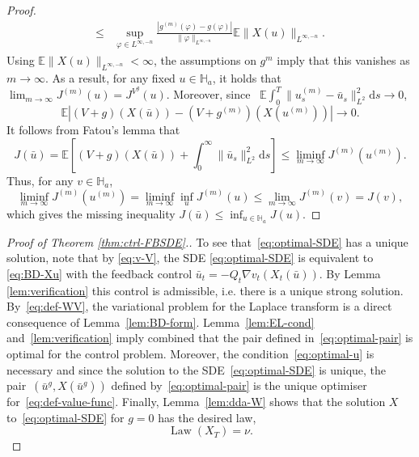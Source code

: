 \documentclass[11pt, a4paper]{scrartcl}
\numberwithin{equation}{section}
\theoremstyle{plain}
\theoremstyle{remark}
\newcommand{\mathd}{\mathrm{d}}
\newcommand{\tmop}[1]{\ensuremath{\operatorname{#1}}}
\begin{document}
\begin{proof}
\begin{equation*}
\begin{aligned}
    \leqslant&
    \sup_{\varphi \in L^{\infty, - n}} \frac{| g^{(m)}(\varphi) - g(\varphi) |}{\|\varphi\|_{L^{\infty,-n}}} \mathbb{E} \|X(u)\|_{L^{\infty,-n}}.
    \end{aligned}
  \end{equation*}
  Using $\mathbb{E} \|X(u)\|_{L^{\infty,-n}}<\infty$, the assumptions on $g^{m}$ imply that this vanishes as $m\to\infty$. As a result, for any fixed $u \in \mathbb{H}_a$, it holds that $\lim_{m \rightarrow \infty}
  J^{(m)} (u) = J^{V^g} (u) $. Moreover, since \ $\mathbb{E} {\int_0^T}  \|
  u_s^{(m)} - \bar{u}_s \|_{L^2}^2 \mathd s \rightarrow 0$, 
  \[ \mathbb{E} | (V + g) (X (\bar{u})) - (V + g^{(m)}) (X (u^{(m)})) |
     \rightarrow 0. \]
  It follows from Fatou's lemma that
  \[ J (\bar{u}) =\mathbb{E} \left[ (V + g) (X (\bar{u})) + \int_0^{\infty}
     \| \bar{u}_s \|_{L^2}^2 \mathd s \right] \leqslant \liminf_{m \rightarrow
     \infty} J^{(m)} (u^{(m)}) . \]
  Thus, for any $v \in \mathbb{H}_a$,
  \[ \liminf_{m \rightarrow \infty} J^{(m)} (u^{(m)}) = \liminf_{m \rightarrow
     \infty} \inf_u J^{(m)} (u) \leqslant \lim_{m \rightarrow \infty} J^{(m)}
     (v) = J (v), \]
  which gives the missing inequality $J (\bar{u}) \leqslant \inf_{u \in
  \mathbb{H}_a} J (u)$.
\end{proof}

\begin{proof}[Proof of Theorem \ref{thm:ctrl-FBSDE}.]
  To see that~\eqref{eq:optimal-SDE} has a unique solution, note that by
  \eqref{eq:v-V}, the SDE \eqref{eq:optimal-SDE} is equivalent to
  \eqref{eq:BD-Xu} with the feedback control $\bar{u}_t = - Q_t \nabla v_t
  (X_t (\bar{u}))$. By Lemma \ref{lem:verification} this control is
  admissible, i.e. there is a unique strong solution. By~\eqref{eq:def-WV},
  the variational problem for the Laplace transform is a direct consequence of
  Lemma~\ref{lem:BD-form}. Lemma~\ref{lem:EL-cond} and~\ref{lem:verification}
  imply combined that the pair defined in~\eqref{eq:optimal-pair} is optimal
  for the control problem. Moreover, the condition~\eqref{eq:optimal-u} is
  necessary and since the solution to the SDE~\eqref{eq:optimal-SDE} is
  unique, the pair~$(\bar{u}^g, X (\bar{u}^g))$ defined
  by~\eqref{eq:optimal-pair} is the unique optimiser
  for~\eqref{eq:def-value-func}. Finally, Lemma~\ref{lem:dda-W} shows that the solution $X$ to~\eqref{eq:optimal-SDE}
  for $g = 0$ has the desired law,
  \[ \tmop{Law} (X_T) = \nu . \]
\end{proof}
\end{document}
